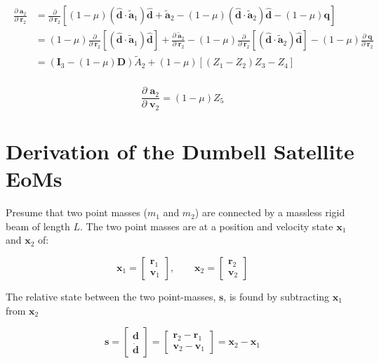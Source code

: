 \documentclass[]{article}
\newcommand{\pd}[2]{\frac{\partial\;#1}{\partial\;#2}}
\newcommand{\pddown}[2]{\frac{\partial}{\partial\;#2} \left[ #1 \right] }
\begin{document}
	\begin{align*}
	\begin{split}
		\pd{\mathbf{a}_2}{\mathbf{r}_2}
		&= \pddown{(1 - \mu) (\hat{\mathbf{d}} \cdot \tilde{\mathbf{a}}_1) \hat{\mathbf{d}} + \tilde{\mathbf{a}}_2 - (1 - \mu) (\hat{\mathbf{d}}\cdot  \tilde{\mathbf{a}}_2) \hat{\mathbf{d}} - (1-\mu) \mathbf{q}}{\mathbf{r}_2} \\
		&= (1 - \mu) \pddown{(\hat{\mathbf{d}} \cdot \tilde{\mathbf{a}}_1) \hat{\mathbf{d}}}{\mathbf{r}_2} + \pd{\tilde{\mathbf{a}}_2}{\mathbf{r}_2} - (1 - \mu) \pddown{(\hat{\mathbf{d}}\cdot  \tilde{\mathbf{a}}_2) \hat{\mathbf{d}}}{\mathbf{r}_2} - (1-\mu) \pd{\mathbf{q}}{\mathbf{r}_2} \\
		&= (\mathbf{I}_3 - (1 - \mu) \mathbf{D}) \tilde{A}_2 + (1 - \mu) [(Z_1 - Z_2) Z_3 - Z_4] \\
	\end{split}
	\end{align*}

	\begin{equation*}
		\pd{\mathbf{a}_2}{\mathbf{v}_2} = (1-\mu) Z_5
	\end{equation*}

	\clearpage \appendix

	\section{Derivation of the Dumbell Satellite EoMs}

	Presume that two point masses ($m_1$ and $m_2$) are connected by a massless rigid beam of length $L$.  The two point masses are at a position and velocity state $\mathbf{x}_1$ and $\mathbf{x}_2$ of:

	\begin{equation*}
		\mathbf{x}_1 = \begin{bmatrix}
			\mathbf{r}_1 \\ \mathbf{v}_1
		\end{bmatrix}, \quad\quad \mathbf{x}_2 = \begin{bmatrix}
			\mathbf{r}_2 \\ \mathbf{v}_2
		\end{bmatrix}
	\end{equation*}

	The relative state between the two point-masses, $\mathbf{s}$, is found by subtracting $\mathbf{x}_1$ from $\mathbf{x}_2$

	\begin{equation*}
		\mathbf{s} = \begin{bmatrix}
			\mathbf{d} \\ \dot{\mathbf{d}}
		\end{bmatrix} = \begin{bmatrix}
			\mathbf{r}_2 - \mathbf{r}_1 \\ \mathbf{v}_2 - \mathbf{v}_1
		\end{bmatrix} = \mathbf{x}_2 - \mathbf{x}_1
	\end{equation*}
\end{document}
